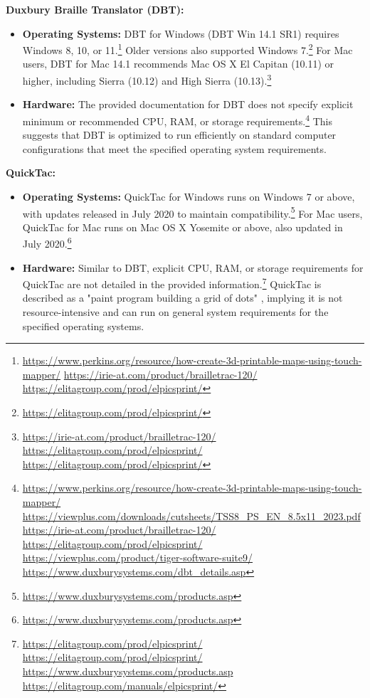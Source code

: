 \textbf{Duxbury Braille Translator (DBT):}
\begin{itemize}
    \item \textbf{Operating Systems:} DBT for Windows (DBT Win 14.1 SR1) requires Windows 8, 10, or 11.\footnote{\url{https://www.perkins.org/resource/how-create-3d-printable-maps-using-touch-mapper/} \url{https://irie-at.com/product/brailletrac-120/} \url{https://elitagroup.com/prod/elpicsprint/}} Older versions also supported Windows 7.\footnote{\url{https://elitagroup.com/prod/elpicsprint/}} For Mac users, DBT for Mac 14.1 recommends Mac OS X El Capitan (10.11) or higher, including Sierra (10.12) and High Sierra (10.13).\footnote{\url{https://irie-at.com/product/brailletrac-120/} \url{https://elitagroup.com/prod/elpicsprint/} \url{https://elitagroup.com/prod/elpicsprint/}}
    \item \textbf{Hardware:} The provided documentation for DBT does not specify explicit minimum or recommended CPU, RAM, or storage requirements.\footnote{\url{https://www.perkins.org/resource/how-create-3d-printable-maps-using-touch-mapper/} \url{https://viewplus.com/downloads/cutsheets/TSS8_PS_EN_8.5x11_2023.pdf} \url{https://irie-at.com/product/brailletrac-120/} \url{https://elitagroup.com/prod/elpicsprint/} \url{https://viewplus.com/product/tiger-software-suite9/} \url{https://www.duxburysystems.com/dbt_details.asp}} This suggests that DBT is optimized to run efficiently on standard computer configurations that meet the specified operating system requirements.
\end{itemize}

\textbf{QuickTac:}
\begin{itemize}
    \item \textbf{Operating Systems:} QuickTac for Windows runs on Windows 7 or above, with updates released in July 2020 to maintain compatibility.\footnote{\url{https://www.duxburysystems.com/products.asp}} For Mac users, QuickTac for Mac runs on Mac OS X Yosemite or above, also updated in July 2020.\footnote{\url{https://www.duxburysystems.com/products.asp}}
    \item \textbf{Hardware:} Similar to DBT, explicit CPU, RAM, or storage requirements for QuickTac are not detailed in the provided information.\footnote{\url{https://elitagroup.com/prod/elpicsprint/} \url{https://elitagroup.com/prod/elpicsprint/} \url{https://www.duxburysystems.com/products.asp} \url{https://elitagroup.com/manuals/elpicsprint/}} QuickTac is described as a "paint program building a grid of dots" \cite{}, implying it is not resource-intensive and can run on general system requirements for the specified operating systems.
\end{itemize}

